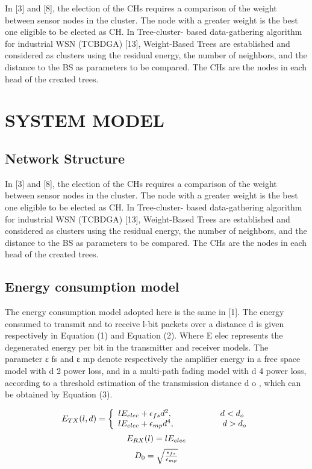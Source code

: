 \documentclass[12 pt]{report}
\begin{document}
\qquad
In [3] and [8], the election of the CHs requires a
comparison of the weight between sensor nodes in the cluster.
The node with a greater weight is the best one eligible to be
elected as CH. In Tree-cluster- based data-gathering algorithm
for industrial WSN (TCBDGA) [13], Weight-Based Trees are
established and considered as clusters using the residual
energy, the number of neighbors, and the distance to the BS as
parameters to be compared. The CHs are the nodes in each
head of the created trees.
\chapter{SYSTEM MODEL}
\section{Network Structure}
\qquad
In [3] and [8], the election of the CHs requires a
comparison of the weight between sensor nodes in the cluster.
The node with a greater weight is the best one eligible to be
elected as CH. In Tree-cluster- based data-gathering algorithm
for industrial WSN (TCBDGA) [13], Weight-Based Trees are
established and considered as clusters using the residual
energy, the number of neighbors, and the distance to the BS as
parameters to be compared. The CHs are the nodes in each
head of the created trees.
\section{Energy consumption model}
\qquad
The energy consumption model adopted here is the same
in [1]. The energy consumed to transmit and to receive l-bit
packets over a distance d is given respectively in Equation (1)
and Equation (2). Where E elec represents the degenerated
energy per bit in the transmitter and receiver models. The
parameter ε fs and ε mp denote respectively the amplifier energy
in a free space model with d 2 power loss, and in a multi-path
fading model with d 4 power loss, according to a threshold
estimation of the transmission distance d o , which can be
obtained by Equation (3).
\newpage

\begin{equation}
$$E_{TX}(l,d)=\left\lbrace\begin{array}{ll}
lE_{elec}+\epsilon_{fs}	d^2,\hspace{2cm}d<d_{o}\\
lE_{elec}+\epsilon_{mp}	d^4,\hspace{2cm}d>d_{o}\\
\end{array}\right.$$
\end{equation}
\begin{equation}
$$E_{RX}(l)=lE_{elec}
\end{equation}
\begin{equation}
$$D_{0}=\sqrt{\frac{\epsilon_{fs}}{\epsilon_{mp}}}
\end{equation}
\end{document}
